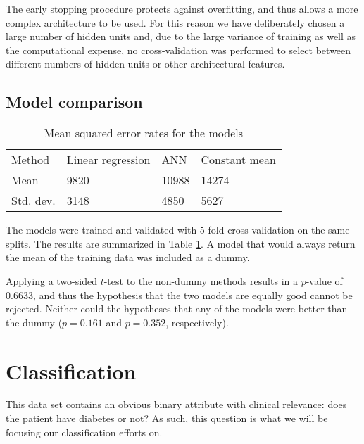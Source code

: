 The early stopping procedure protects against overfitting,
and thus allows a more complex architecture to be used.
For this reason we have deliberately chosen a large number of hidden units
and, due to the large variance of training as well as the computational expense,
no cross-validation was performed to select between different numbers of hidden units
or other architectural features.

\subsection{Model comparison}
\begin{table}[h]
\centering
\caption{Mean squared error rates for the models}
\label{error-rates}
\begin{tabular}{l|lll}
  Method & Linear regression & ANN & Constant mean\\
  Mean & 9820 & 10988 & 14274\\
  Std. dev. & 3148 & 4850 & 5627\\
\end{tabular}
\end{table}

The models were trained and validated with 5-fold cross-validation on the same splits.
The results are summarized in Table \ref{error-rates}.
A model that would always return the mean of the training data was included as a dummy.

Applying a two-sided $t$-test to the non-dummy methods
results in a $p$-value of $0.6633$,
and thus the hypothesis that the two models are equally good cannot be rejected.
Neither could the hypotheses that any of the models were better than the dummy
($p = 0.161$ and $p = 0.352$, respectively).



\section{Classification}

This data set contains an obvious binary attribute
with clinical relevance:
does the patient have diabetes or not?
As such, this question is what we will be
focusing our classification efforts on.

